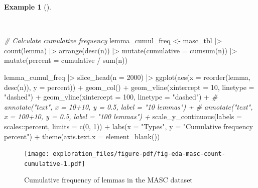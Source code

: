 \documentclass[
  letterpaper,
  DIV=11,
  numbers=noendperiod]{scrreport}
\newenvironment{Shaded}{\begin{snugshade}}{\end{snugshade}}
\newcommand{\AttributeTok}[1]{\textcolor[rgb]{0.00,0.00,0.00}{#1}}
\newcommand{\CommentTok}[1]{\textcolor[rgb]{0.00,0.00,0.00}{\textit{#1}}}
\newcommand{\DecValTok}[1]{\textcolor[rgb]{0.00,0.00,0.00}{#1}}
\newcommand{\FunctionTok}[1]{\textcolor[rgb]{0.00,0.00,0.00}{#1}}
\newcommand{\NormalTok}[1]{\textcolor[rgb]{0.00,0.00,0.00}{#1}}
\newcommand{\OtherTok}[1]{\textcolor[rgb]{0.00,0.00,0.00}{#1}}
\newcommand{\SpecialCharTok}[1]{\textcolor[rgb]{0.00,0.00,0.00}{#1}}
\newcommand{\StringTok}[1]{\textcolor[rgb]{0.00,0.00,0.00}{#1}}
\theoremstyle{definition}
\newtheorem{example}{Example}[chapter]
\theoremstyle{remark}
\begin{document}
\begin{example}[]\protect\hypertarget{exm-eda-masc-count-cumulative}{}\label{exm-eda-masc-count-cumulative}

~

\begin{Shaded}
\begin{Highlighting}[]
\CommentTok{\# Calculate cumulative frequency}
\NormalTok{lemma\_cumul\_freq }\OtherTok{\textless{}{-}} 
\NormalTok{  masc\_tbl }\SpecialCharTok{|\textgreater{}} 
  \FunctionTok{count}\NormalTok{(lemma) }\SpecialCharTok{|\textgreater{}} 
  \FunctionTok{arrange}\NormalTok{(}\FunctionTok{desc}\NormalTok{(n)) }\SpecialCharTok{|\textgreater{}} 
  \FunctionTok{mutate}\NormalTok{(}\AttributeTok{cumulative =} \FunctionTok{cumsum}\NormalTok{(n)) }\SpecialCharTok{|\textgreater{}} 
  \FunctionTok{mutate}\NormalTok{(}\AttributeTok{percent =}\NormalTok{ cumulative }\SpecialCharTok{/} \FunctionTok{sum}\NormalTok{(n))}

\NormalTok{lemma\_cumul\_freq }\SpecialCharTok{|\textgreater{}}
  \FunctionTok{slice\_head}\NormalTok{(}\AttributeTok{n =} \DecValTok{2000}\NormalTok{) }\SpecialCharTok{|\textgreater{}} 
  \FunctionTok{ggplot}\NormalTok{(}\FunctionTok{aes}\NormalTok{(}\AttributeTok{x =} \FunctionTok{reorder}\NormalTok{(lemma, }\FunctionTok{desc}\NormalTok{(n)), }\AttributeTok{y =}\NormalTok{ percent)) }\SpecialCharTok{+}
  \FunctionTok{geom\_col}\NormalTok{() }\SpecialCharTok{+}
  \FunctionTok{geom\_vline}\NormalTok{(}\AttributeTok{xintercept =} \DecValTok{10}\NormalTok{, }\AttributeTok{linetype =} \StringTok{"dashed"}\NormalTok{) }\SpecialCharTok{+}
  \FunctionTok{geom\_vline}\NormalTok{(}\AttributeTok{xintercept =} \DecValTok{100}\NormalTok{, }\AttributeTok{linetype =} \StringTok{"dashed"}\NormalTok{) }\SpecialCharTok{+}
  \CommentTok{\# annotate("text", x = 10+10, y = 0.5, label = "10 lemmas") +}
  \CommentTok{\# annotate("text", x = 100+10, y = 0.5, label = "100 lemmas") +}
  \FunctionTok{scale\_y\_continuous}\NormalTok{(}\AttributeTok{labels =}\NormalTok{ scales}\SpecialCharTok{::}\NormalTok{percent, }\AttributeTok{limits =} \FunctionTok{c}\NormalTok{(}\DecValTok{0}\NormalTok{, }\DecValTok{1}\NormalTok{)) }\SpecialCharTok{+}
  \FunctionTok{labs}\NormalTok{(}\AttributeTok{x =} \StringTok{"Types"}\NormalTok{, }\AttributeTok{y =} \StringTok{"Cumulative frequency percent"}\NormalTok{) }\SpecialCharTok{+}
  \FunctionTok{theme}\NormalTok{(}\AttributeTok{axis.text.x =} \FunctionTok{element\_blank}\NormalTok{())}
\end{Highlighting}
\end{Shaded}

\begin{figure}[H]

{\centering \texttt{[image: exploration\_files/figure-pdf/fig-eda-masc-count-cumulative-1.pdf]}

}

\caption{\label{fig-eda-masc-count-cumulative}Cumulative frequency of
lemmas in the MASC dataset}

\end{figure}

\end{example}
\end{document}
